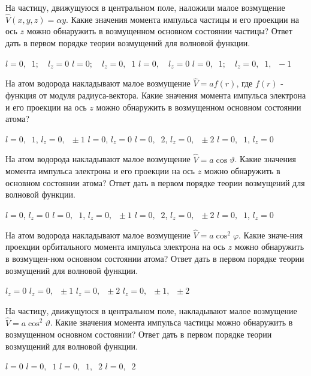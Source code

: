 \documentclass[11pt,a4paper]{exam}
\begin{document}
\begin{questions}
\question На частицу, движущуюся в центральном поле, наложили малое возмущение $\hat V(x,y,z) = \alpha y$. Какие значения момента импульса частицы и его проекции на ось $z$ можно обнаружить в возмущенном основном состоянии частицы? Ответ дать в первом порядке теории возмущений для волновой функции.
\begin{choices}
\choice $l = 0,\;\;1;\quad {l_z} = 0$ 
\choice $l = 0;\quad {l_z} = 0,\;\;1$ 
\choice $l = 0,\quad {l_z} = 0$ 
\choice $l = 0,\;\;1;\quad {l_z} = 0,\;\;1,\;\; - 1$
\end{choices}

\question На атом водорода накладывают малое возмущение $\hat V = af(r)$, где $f(r)$ - функция от модуля радиуса-вектора. Какие значения момента импульса электрона и его проекции на ось $z$ можно обнаружить в возмущенном основном состоянии атома? 
\begin{choices}
\choice $l = 0,\;\;1$, ${l_z} = 0,\;\; \pm 1$     
\choice $l = 0$, ${l_z} = 0$ 
\choice $l = 0,\;\;2$, ${l_z} = 0,\;\; \pm 2$     
\choice $l = 0,\;\;1$, ${l_z} = 0$
\end{choices}

\question На атом водорода накладывают малое возмущение $\hat V = a\cos \vartheta $. Какие значения момента импульса электрона и его проекции на ось $z$ можно обнаружить в основном состоянии атома? Ответ дать в первом порядке теории возмущений для волновой функции.
\begin{choices}
\choice $l = 0$, ${l_z} = 0$ 
\choice $l = 0,\;\;1$, ${l_z} = 0,\;\; \pm 1$     
\choice $l = 0,\;\;2$, ${l_z} = 0,\;\; \pm 2$  
\choice $l = 0,\;\;1$, ${l_z} = 0$
\end{choices}

\question На атом водорода накладывают малое возмущение $\hat V = a{\cos ^2}\varphi $. Какие значе-ния проекции орбитального момента импульса электрона на ось $z$ можно обнаружить в возмущен-ном основном состоянии атома? Ответ дать в первом порядке теории возмущений для волновой функции.
\begin{choices}
\choice ${l_z} = 0$ 
\choice ${l_z} = 0,\;\; \pm 1$     
\choice ${l_z} = 0,\;\; \pm 2$     
\choice ${l_z} = 0,\;\; \pm 1,\;\; \pm 2$ 
\end{choices}

\question На частицу, движущуюся в центральном поле, накладывают малое возмущение $\hat V = a{\cos ^2}\vartheta $. Какие значения момента импульса частицы можно обнаружить в возмущенном основном состоянии? Ответ дать в первом порядке теории возмущений для волновой функции.
\begin{choices}
\choice $l = 0$  
\choice $l = 0,\;\;1$     
\choice $l = 0,\;\;1,\;\;2$     
\choice $l = 0,\;\;2$
\end{choices}


\end{questions}
\end{document}

